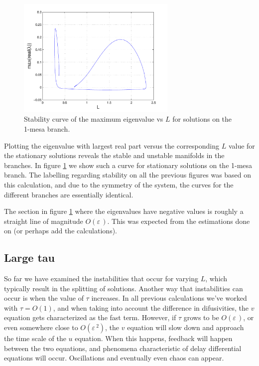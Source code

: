 \documentclass[a4paper,10pt]{article}
\newcommand{\Ep}{\ensuremath{\varepsilon\,}}
\begin{document}
% 
\begin{figure}[htb]
\begin{center}
\includegraphics[width=3in]{eigs_1}
\caption{Stability curve of the maximum eigenvalue vs $L$ for solutions on the 1-mesa branch.}
\label{fig:eigs1}
\end{center}
\end{figure}
% 

Plotting the eigenvalue with largest real part versus the corresponding $L$ value for the stationary solutions reveals the stable and unstable manifolds in the branches. In figure \ref{fig:eigs1} we show such a curve for stationary solutions on the 1-mesa branch. The labelling regarding stability on all the previous figures was based on this calculation, and due to the symmetry of the system, the curves for the different branches are essentially identical.

The section in figure \ref{fig:eigs1} where the eigenvalues have negative values is roughly a straight line of magnitude $O(\Ep)$. This was expected from the estimations done on \cite{kolokolnikov_spot_2009} (or perhaps add the calculations).

\subsection{Large tau}

So far we have examined the instabilities that occur for varying $L$, which typically result in the splitting of solutions. Another way that instabilities can occur is when the value of $\tau$ increases. In all previous calculations we've worked with $\tau=O(1)$, and when taking into account the difference in difusivities, the $v$ equation gets characterized as the fast term. However, if $\tau$ grows to be $O(\Ep)$, or even somewhere close to $O(\Ep^2)$, the $v$ equation will slow down and approach the time scale of the $u$ equation. When this happens, feedback will happen between the two equations, and phenomena characteristic of delay differential equations will occur. Oscillations and eventually even chaos can appear. 
\end{document}
